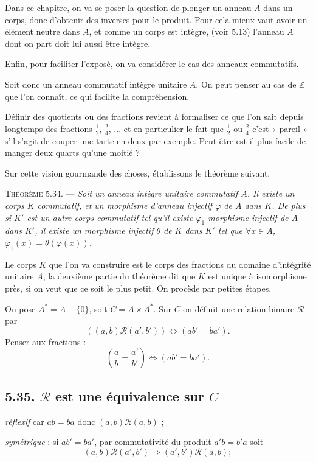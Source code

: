 Dans ce chapitre, on va se poser la question de plonger un anneau $A$ dans un corps, donc d'obtenir des inverses pour le produit. Pour cela mieux vaut avoir un élément neutre dans $A$, et comme un corps est intègre, (voir 5.13) l'anneau $A$ dont on part doit lui aussi être intègre.

Enfin, pour faciliter l'exposé, on va considérer le cas des anneaux commutatifs.

Soit donc un anneau commutatif intègre unitaire $A$. On peut penser au cas de $\mathbb Z$ que l'on connaît, ce qui facilite la compréhension.

Définir des quotients ou des fractions revient à formaliser ce que l'on sait depuis longtemps des fractions $\frac12$, $\frac24$, ... et en particulier le fait que $\frac12$ ou $\frac24$ c'est « pareil » s'il s'agit de couper une tarte en deux par exemple. Peut-être est-il plus facile de manger deux quarts qu'une moitié ?

Sur cette vision gourmande des choses, établissons le théorème suivant.

\medskip\noindent\textsc{Théorème 5.34.} --- \emph{Soit un anneau intègre unitaire commutatif $A$. Il existe un corps $K$ commutatif, et un morphisme d'anneau injectif $\varphi$ de $A$ dans $K$. De plus si $K'$ est un autre corps commutatif tel qu'il existe $\varphi_1$ morphisme injectif de $A$ dans $K'$, il existe un morphisme injectif $\theta$ de $K$ dans $K'$ tel que $\forall x\in A$, $\varphi_1(x)=\theta(\varphi(x))$.}

Le corps $K$ que l'on va construire est le corps des fractions du domaine d'intégrité unitaire $A$, la deuxième partie du théorème dit que $K$ est unique à isomorphisme près, si on veut que ce soit le plus petit. On procède par petites étapes.

On pose $A^*=A-\{0\}$, soit $C=A\times A^*$. Sur $C$ on définit une relation binaire $\mathcal R$ par
\[
((a,b)\mathcal R(a',b'))\Longleftrightarrow(ab'=ba').
\]
Penser aux fractions :
\[
\left(\frac ab=\frac{a'}{b'}\right)\Longleftrightarrow(ab'=ba').
\]

\subsection*{5.35. $\mathcal R$ est une équivalence sur $C$}
\emph{réflexif} car $ab=ba$ donc $(a,b)\mathcal R(a,b)$ ;

\emph{symétrique} : si $ab'=ba'$, par commutativité du produit $a'b=b'a$ soit
\[
(a,b)\mathcal R(a',b')\Rightarrow(a',b')\mathcal R(a,b);
\]

